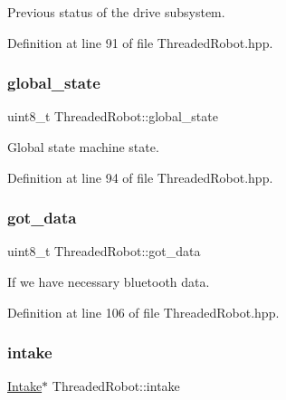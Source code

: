 Previous status of the drive subsystem. 



Definition at line 91 of file Threaded\+Robot.\+hpp.

\mbox{\label{class_threaded_robot_a92782be4dc437d7e84b04d20a39a5de3}} 
\subsubsection{\texorpdfstring{global\+\_\+state}{global\_state}}
{\footnotesize\ttfamily uint8\+\_\+t Threaded\+Robot\+::global\+\_\+state\hspace{0.3cm}{\ttfamily [private]}}



Global state machine state. 



Definition at line 94 of file Threaded\+Robot.\+hpp.

\mbox{\label{class_threaded_robot_a506989a00617c30a8a1930773a0b7d41}} 
\subsubsection{\texorpdfstring{got\+\_\+data}{got\_data}}
{\footnotesize\ttfamily uint8\+\_\+t Threaded\+Robot\+::got\+\_\+data\hspace{0.3cm}{\ttfamily [private]}}



If we have necessary bluetooth data. 



Definition at line 106 of file Threaded\+Robot.\+hpp.

\mbox{\label{class_threaded_robot_ac4e32d1373e0d8a887c29378c002783f}} 
\subsubsection{\texorpdfstring{intake}{intake}}
{\footnotesize\ttfamily \hyperlink{class_intake}{Intake}$\ast$ Threaded\+Robot\+::intake\hspace{0.3cm}{\ttfamily [private]}}



